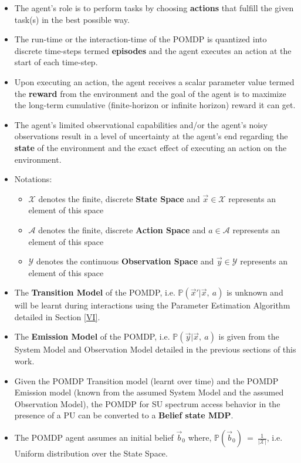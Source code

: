 \documentclass[12pt, draftcls, onecolumn]{IEEEtran}
\begin{document}
\begin{itemize}
    \item The agent's role is to perform tasks by choosing \textbf{actions} that fulfill the given task(s) in the best possible way.
    \item The run-time or the interaction-time of the POMDP is quantized into discrete time-steps termed \textbf{episodes} and the agent executes an action at the start of each time-step.
    \item Upon executing an action, the agent receives a scalar parameter value termed the \textbf{reward} from the environment and the goal of the agent is to maximize the long-term cumulative (finite-horizon or infinite horizon) reward it can get.
    \item The agent's limited observational capabilities and/or the agent's noisy observations result in a level of uncertainty at the agent's end regarding the \textbf{state} of the environment and the exact effect of executing an action on the environment.
    \item Notations: \begin{itemize}
        \item $\mathcal{X}$ denotes the finite, discrete \textbf{State Space} and $\vec{x} \in \mathcal{X}$ represents an element of this space
        \item $\mathcal{A}$ denotes the finite, discrete \textbf{Action Space} and $a \in \mathcal{A}$ represents an element of this space
        \item $\mathcal{Y}$ denotes the continuous \textbf{Observation Space} and $\vec{y} \in \mathcal{Y}$ represents an element of this space
    \end{itemize}
    \item The \textbf{Transition Model} of the POMDP, i.e. $\mathbb{P}(\vec{x}'|\vec{x},\ a)$ is unknown and will be learnt during interactions using the Parameter Estimation Algorithm detailed in Section \ref{VI}.
    \item The \textbf{Emission Model} of the POMDP, i.e. $\mathbb{P}(\vec{y}|\vec{x},\ a)$ is given from the System Model and Observation Model detailed in the previous sections of this work.
    \item Given the POMDP Transition model (learnt over time) and the POMDP Emission model (known from the assumed System Model and the assumed Observation Model), the POMDP for SU spectrum access behavior in the presence of a PU can be converted to a \textbf{Belief state MDP}.
    \item The POMDP agent assumes an initial belief $\vec{b}_0$ where, $\mathbb{P}(\vec{b}_0)\ =\ \frac{1}{|\mathcal{X}|}$, i.e. Uniform distribution over the State Space.

\end{itemize}
\end{document}
